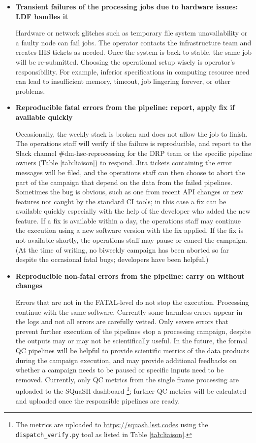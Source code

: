 \documentclass[DM,authoryear,toc]{lsstdoc}
\begin{document}
\begin{itemize}
  \item \textbf{Transient failures of the processing jobs due to
  hardware issues: LDF handles it}

  Hardware or network glitches such as temporary file system
  unavailability or a faulty node can fail jobs. The operator
  contacts the infrastructure team and creates IHS tickets as needed.
  Once the system is back to stable, the same job will be re-submitted.
  Choosing the operational setup wisely is operator’s responsibility.
  For example, inferior specifications in computing resource need
  can lead to insufficient memory, timeout, job lingering forever,
  or other problems.

  \item \textbf{Reproducible fatal errors from the pipeline: report,
  apply fix if available quickly}

  Occasionally, the weekly stack is broken and does not allow the job to
  finish. The operations staff will verify if the failure is reproducible, and
  report to the Slack channel \#dm-hsc-reprocessing for the DRP team
  or the specific pipeline owners (Table \ref{tab:liaison})
  to respond. Jira tickets containing the error messages will be
  filed, and the operations staff can then choose to abort the
  part of the campaign that depend on the data from the failed
  pipelines.  Sometimes the bug is obvious, such as one from recent
  API changes or new features not caught by the standard CI tools;
  in this case a fix can be available quickly especially with the
  help of the developer who added the new feature.  If a fix is
  available within a day, the operations staff may continue the
  execution using a new software version with the fix applied.  If
  the fix is not available shortly, the operations staff may pause
  or cancel the campaign.
  (At the time of writing, no biweekly campaign has been aborted
  so far despite the occasional fatal bugs; developers have been
  helpful.)

  \item \textbf{Reproducible non-fatal errors from the pipeline:
  carry on without changes}

  Errors that are not in the FATAL-level do not stop the execution.
  Processing continue with the same software. Currently some harmless
  errors appear in the logs and not all errors are carefully vetted.
  Only severe errors that prevent further execution of the pipelines
  stop a processing campaign, despite the outputs may or may not
  be scientifically useful. In the future, the formal QC pipelines
  will be helpful to provide scientific metrics of the data products
  during the campaign execution, and may provide additional feedbacks
  on whether a campaign needs to be paused or specific inputs need
  to be removed. Currently, only QC metrics from the single frame
  processing are uploaded to the SQuaSH dashboard \footnote{The metrics
  are uploaded to \url{https://squash.lsst.codes} using the
  \texttt{dispatch\_verify.py} tool as listed in Table \ref{tab:liaison}.};
  further QC metrics will be calculated and uploaded once the responsible
  pipelines are ready.

\end{itemize}
\end{document}

